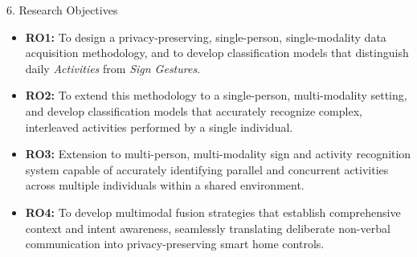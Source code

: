 \documentclass[aspectratio=169,11pt,xcolor=table]{beamer}
\begin{document}

\begin{frame}{6. Research Objectives}
\justifying
\small
\begin{itemize}
    \item \textbf{RO1:} To design a privacy-preserving, single-person, single-modality data acquisition methodology, and to develop classification models that distinguish daily \textit{Activities} from \textit{Sign Gestures}.

    \item \textbf{RO2:} To extend this methodology to a single-person, multi-modality setting, and develop classification models that accurately recognize complex, interleaved activities performed by a single individual.

    \item \textbf{RO3:} Extension to multi-person, multi-modality sign and activity recognition system  capable of accurately identifying  parallel and concurrent activities across multiple individuals within a shared environment.

    \item \textbf{RO4:} To develop multimodal fusion strategies that establish comprehensive context and intent awareness, seamlessly translating deliberate non-verbal communication into privacy-preserving smart home controls.
\end{itemize}
\end{frame}

\end{document}
